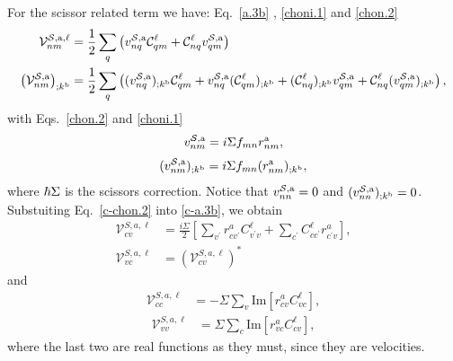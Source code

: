 For the scissor related term we have:
Eq.~\eqref{a.3b} , \eqref{choni.1} and \eqref{chon.2}
\begin{align}\label{c-a.3b}
{\mathbf{\cal V}}^{{\cal S},\mathrm{a},\ell}_{nm}
&=
\frac{1}{2}\sum_q\left( 
v^{{\cal S},\mathrm{a}}_{nq}{\mathbf{\cal C}}^\ell_{qm}+{\mathbf{\cal C}}^\ell_{nq} v^{{\cal S},\mathrm{a}}_{qm}
\right)
\nonumber\\
\left({\mathbf{\cal V}}^{{\cal S},\mathrm{a}}_{nm}\right)_{;k^{\mathrm{b}}}
&=
\frac{1}{2}\sum_q\left(
(v^{{\cal S},\mathrm{a}}_{nq})_{;k^{\mathrm{b}}}{\mathbf{\cal C}}^\ell_{qm}
+  
v^{{\cal S},\mathrm{a}}_{nq}({\mathbf{\cal C}}^\ell_{qm})_{;k^{\mathrm{b}}}
+
({\mathbf{\cal C}}^\ell_{nq})_{;k^{\mathrm{b}}} v^{{\cal S},\mathrm{a}}_{qm}
+
{\mathbf{\cal C}}^\ell_{nq} (v^{{\cal S},\mathrm{a}}_{qm})_{;k^{\mathrm{b}}}
\right)
,
\end{align}  
with Eqs.~\eqref{chon.2} and \eqref{choni.1}
\begin{align}\label{c-chon.2} 
v^{{\cal S},\mathrm{a}}_{nm}=i\Sigma f_{mn}r^{\mathrm{a}}_{nm}
,
\end{align}
\begin{align}\label{c-choni.1}
(v^{{\cal S},\mathrm{a}}_{nm})_{;k^{\mathrm{b}}}=i\Sigma f_{mn}
(r^{\mathrm{a}}_{nm})_{;k^{\mathrm{b}}}
,
\end{align}
where $\hbar\Sigma$ is the scissors correction.
Notice that
$v^{{\cal S},\mathrm{a}}_{nn}=0$ and 
$(v^{{\cal S},\mathrm{a}}_{nn})_{;k^{\mathrm{b}}}=0$.
Substuiting Eq.~\eqref{c-chon.2} into \eqref{c-a.3b}, we obtain
  \begin{align}\label{vs.cv}
      \mathcal{V}^{S,a,\ell}_{cv}
&= 
      \frac{i\Sigma}{2}
      \left[\sum_{v^{\prime}}r^{a}_{cv^{\prime}}C^{\ell}_{v^{\prime}v} 
          + \sum_{c^{\prime}}C^{\ell}_{cc^{\prime}}r^{a}_{c^{\prime}v}\right],
\nonumber\\
      \mathcal{V}^{S,a,\ell}_{vc}
&= 
      (\mathcal{V}^{S,a,\ell}_{cv})^*
    \end{align}
and    
  \begin{align}\label{vs.cc}
    \mathcal{V}^{S,a,\ell}_{cc} 
    &= -\Sigma\sum_{v}
    \text{Im}\left[r^{a}_{cv}C^{\ell}_{vc}\right],
  \end{align}
 \begin{align}\label{vs.vv}
    \mathcal{V}^{S,a,\ell}_{vv} 
    &= \Sigma\sum_{c}
    \text{Im}\left[r^{a}_{vc}C^{\ell}_{cv}\right],
  \end{align}
where the last two are real functions as they must, since they are velocities.
